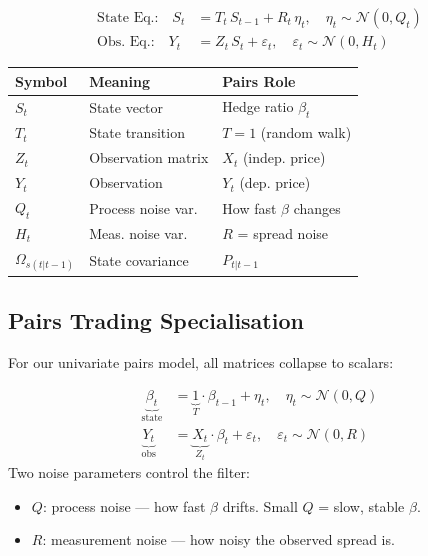 \documentclass[10pt,a4paper,twocolumn]{article}
\begin{document}
\begin{tcolorbox}[mathbox={General State-Space Model}]
\vspace{-4pt}
\begin{align}
  \text{State Eq.:}\quad
  S_t &= T_t\,S_{t-1} + R_t\,\eta_t, \quad \eta_t \sim \mathcal{N}(0, Q_t)\\
  \text{Obs. Eq.:}\quad
  Y_t &= Z_t\,S_t + \varepsilon_t, \quad \varepsilon_t \sim \mathcal{N}(0, H_t)
\end{align}
\vspace{-4pt}
\begin{center}\small
\begin{tabular}{@{}lll@{}}
\toprule Symbol & Meaning & Pairs Role\\\midrule
$S_t$ & State vector & Hedge ratio $\beta_t$\\
$T_t$ & State transition & $T=1$ (random walk)\\
$Z_t$ & Observation matrix & $X_t$ (indep. price)\\
$Y_t$ & Observation & $Y_t$ (dep. price)\\
$Q_t$ & Process noise var. & How fast $\beta$ changes\\
$H_t$ & Meas. noise var. & $R$ = spread noise\\
$\Omega_{s(t|t-1)}$ & State covariance & $P_{t|t-1}$\\
\bottomrule
\end{tabular}
\end{center}
\end{tcolorbox}

\subsection{Pairs Trading Specialisation}

For our univariate pairs model, all matrices collapse to scalars:
\begin{tcolorbox}[mathbox={Pairs-Trading State Space}]
\vspace{-4pt}
\begin{align}
  \underbrace{\beta_t}_{\text{state}} &= \underbrace{1}_{T}\cdot\beta_{t-1} + \eta_t, \quad \eta_t \sim \mathcal{N}(0, Q)\\
  \underbrace{Y_t}_{\text{obs}} &= \underbrace{X_t}_{Z_t}\cdot\beta_t + \varepsilon_t, \quad \varepsilon_t \sim \mathcal{N}(0, R)
\end{align}
\vspace{-4pt}
Two noise parameters control the filter:
\begin{itemize}\setlength\itemsep{0pt}
  \item $Q$: process noise --- how fast $\beta$ drifts. Small $Q$ = slow, stable $\beta$.
  \item $R$: measurement noise --- how noisy the observed spread is.
\end{itemize}
\end{tcolorbox}
\end{document}
